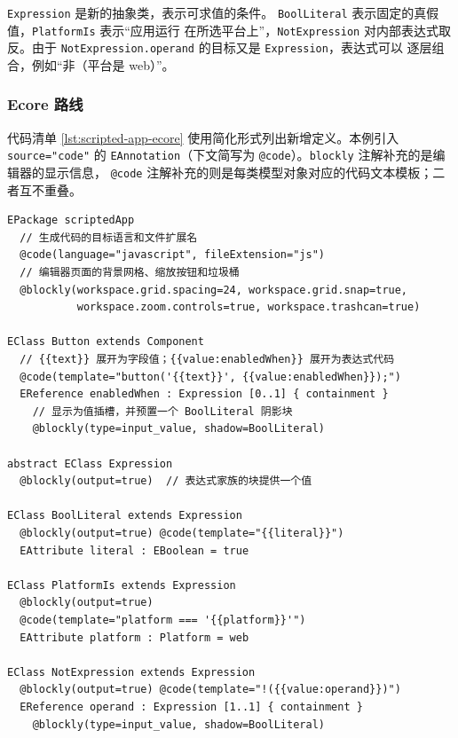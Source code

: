 \texttt{Expression} 是新的抽象类，表示可求值的条件。
\texttt{BoolLiteral} 表示固定的真假值，\texttt{PlatformIs} 表示“应用运行
在所选平台上”，\texttt{NotExpression} 对内部表达式取反。由于
\texttt{NotExpression.operand} 的目标又是 \texttt{Expression}，表达式可以
逐层组合，例如“非（平台是 web）”。

\subsubsection{Ecore 路线}

代码清单 \ref{lst:scripted-app-ecore} 使用简化形式列出新增定义。本例引入
\texttt{source="code"} 的 \texttt{EAnnotation}（下文简写为
\texttt{@code}）。\texttt{blockly} 注解补充的是编辑器的显示信息，
\texttt{@code} 注解补充的则是每类模型对象对应的代码文本模板；二者互不重叠。

\begin{lstlisting}[style=tfmcode, captionpos=t,
caption={新增 Ecore 定义的简化表示},
label={lst:scripted-app-ecore}]
EPackage scriptedApp
  // 生成代码的目标语言和文件扩展名
  @code(language="javascript", fileExtension="js")
  // 编辑器页面的背景网格、缩放按钮和垃圾桶
  @blockly(workspace.grid.spacing=24, workspace.grid.snap=true,
           workspace.zoom.controls=true, workspace.trashcan=true)

EClass Button extends Component
  // {{text}} 展开为字段值；{{value:enabledWhen}} 展开为表达式代码
  @code(template="button('{{text}}', {{value:enabledWhen}});")
  EReference enabledWhen : Expression [0..1] { containment }
    // 显示为值插槽，并预置一个 BoolLiteral 阴影块
    @blockly(type=input_value, shadow=BoolLiteral)

abstract EClass Expression
  @blockly(output=true)  // 表达式家族的块提供一个值

EClass BoolLiteral extends Expression
  @blockly(output=true) @code(template="{{literal}}")
  EAttribute literal : EBoolean = true

EClass PlatformIs extends Expression
  @blockly(output=true)
  @code(template="platform === '{{platform}}'")
  EAttribute platform : Platform = web

EClass NotExpression extends Expression
  @blockly(output=true) @code(template="!({{value:operand}})")
  EReference operand : Expression [1..1] { containment }
    @blockly(type=input_value, shadow=BoolLiteral)
\end{lstlisting}

